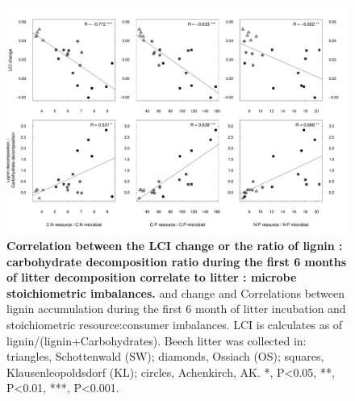 \documentclass[10pt]{article}
\begin{document}
\begin{flushleft}
\newpage
\begin{figure}[h!]
\vspace*{2mm}
\begin{center}
\includegraphics{ligpaper-graphcorr}
\end{center}
\caption{
{\bf Correlation between the LCI change or the ratio of lignin : carbohydrate decomposition ratio during the first 6 months of litter decomposition correlate to litter : microbe stoichiometric imbalances.} and change and Correlations between lignin accumulation during the first 6 month of litter incubation and stoichiometric resource:consumer imbalances. LCI is calculates as of lignin/(lignin+Carbohydrates).  Beech litter was collected in: triangles, Schottenwald (SW); diamonds, Ossiach (OS); squares, Klausenleopoldsdorf (KL); circles, Achenkirch, AK. *, P\textless 0.05, **, P\textless 0.01, ***, P\textless 0.001.}
\end{figure}




\end{flushleft}
\end{document}
